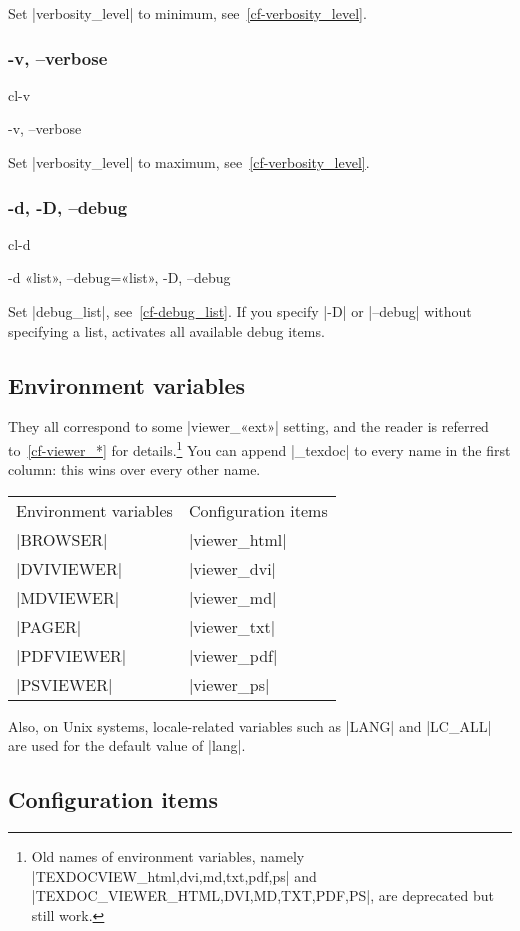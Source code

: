 \documentclass[a4paper, oneside]{scrartcl}
\newif\ifframed
\newenvironment{cmdsubsub}[2]{%
  \framedfalse \commandes\subsubsection{#1}{#2}%
  }{%
  \endcommandes}
\begin{document}
Set |verbosity_level| to minimum, see~\ref{cf-verbosity_level}.

\begin{cmdsubsub}{-v, --verbose}{cl-v}
  -v, --verbose
\end{cmdsubsub}

Set |verbosity_level| to maximum, see~\ref{cf-verbosity_level}.

\begin{cmdsubsub}{-d, -D, --debug}{cl-d}
  -d «list», --debug=«list», -D, --debug
\end{cmdsubsub}

Set |debug_list|, see~\ref{cf-debug_list}. If you specify |-D| or |--debug|
without specifying a list, activates all available debug items.

\subsection{Environment variables}\label{ss-envvar}

They all correspond to some |viewer_«ext»| setting, and the reader is referred
to~\ref{cf-viewer_*} for details.\footnote{Old names of environment variables,
namely |TEXDOCVIEW_{html,dvi,md,txt,pdf,ps}| and
|TEXDOC_VIEWER_{HTML,DVI,MD,TXT,PDF,PS}|, are deprecated but still work.} You can
append |_texdoc| to every name in the first column: this wins over every other
name.

\begin{center}
\begin{tabular}{ll}
Environment variables & Configuration items \\
|BROWSER|             & |viewer_html|       \\
|DVIVIEWER|           & |viewer_dvi|        \\
|MDVIEWER|            & |viewer_md|         \\
|PAGER|               & |viewer_txt|        \\
|PDFVIEWER|           & |viewer_pdf|        \\
|PSVIEWER|            & |viewer_ps|         \\
\end{tabular}
\end{center}

Also, on Unix systems, locale-related variables such as |LANG| and |LC_ALL|
are used for the default value of |lang|.

\subsection{Configuration items}\label{ss-conf}
\end{document}
